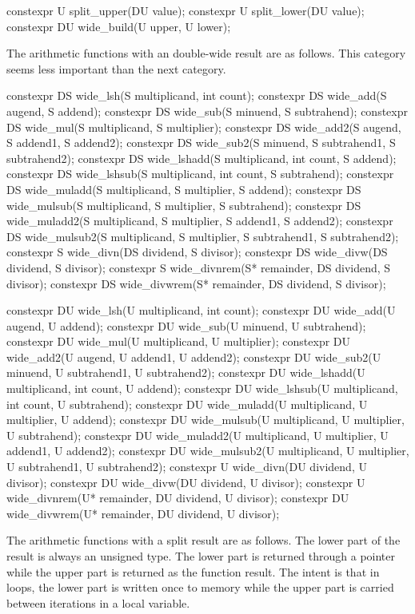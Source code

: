 \begin{addedblock}
\begin{itemdecl}
constexpr U split_upper(DU value);
constexpr U split_lower(DU value);
constexpr DU wide_build(U upper, U lower);
\end{itemdecl}

The arithmetic functions with an double-wide result are as follows. This category seems less important than the next category.

\begin{itemdecl}
constexpr DS wide_lsh(S multiplicand, int count);
constexpr DS wide_add(S augend, S addend);
constexpr DS wide_sub(S minuend, S subtrahend);
constexpr DS wide_mul(S multiplicand, S multiplier);
constexpr DS wide_add2(S augend, S addend1, S addend2);
constexpr DS wide_sub2(S minuend, S subtrahend1, S subtrahend2);
constexpr DS wide_lshadd(S multiplicand, int count, S addend);
constexpr DS wide_lshsub(S multiplicand, int count, S subtrahend);
constexpr DS wide_muladd(S multiplicand, S multiplier, S addend);
constexpr DS wide_mulsub(S multiplicand, S multiplier, S subtrahend);
constexpr DS wide_muladd2(S multiplicand, S multiplier, S addend1, S addend2);
constexpr DS wide_mulsub2(S multiplicand, S multiplier, S subtrahend1, S subtrahend2);
constexpr S wide_divn(DS dividend, S divisor);
constexpr DS wide_divw(DS dividend, S divisor);
constexpr S wide_divnrem(S* remainder, DS dividend, S divisor);
constexpr DS wide_divwrem(S* remainder, DS dividend, S divisor);

constexpr DU wide_lsh(U multiplicand, int count);
constexpr DU wide_add(U augend, U addend);
constexpr DU wide_sub(U minuend, U subtrahend);
constexpr DU wide_mul(U multiplicand, U multiplier);
constexpr DU wide_add2(U augend, U addend1, U addend2);
constexpr DU wide_sub2(U minuend, U subtrahend1, U subtrahend2);
constexpr DU wide_lshadd(U multiplicand, int count, U addend);
constexpr DU wide_lshsub(U multiplicand, int count, U subtrahend);
constexpr DU wide_muladd(U multiplicand, U multiplier, U addend);
constexpr DU wide_mulsub(U multiplicand, U multiplier, U subtrahend);
constexpr DU wide_muladd2(U multiplicand, U multiplier, U addend1, U addend2);
constexpr DU wide_mulsub2(U multiplicand, U multiplier, U subtrahend1, U subtrahend2);
constexpr U wide_divn(DU dividend, U divisor);
constexpr DU wide_divw(DU dividend, U divisor);
constexpr U wide_divnrem(U* remainder, DU dividend, U divisor);
constexpr DU wide_divwrem(U* remainder, DU dividend, U divisor);
\end{itemdecl}

The arithmetic functions with a split result are as follows. The lower part of the result is always an unsigned type. The lower part is returned through a pointer while the upper part is returned as the function result. The intent is that in loops, the lower part is written once to memory while the upper part is carried between iterations in a local variable.


\end{addedblock}
